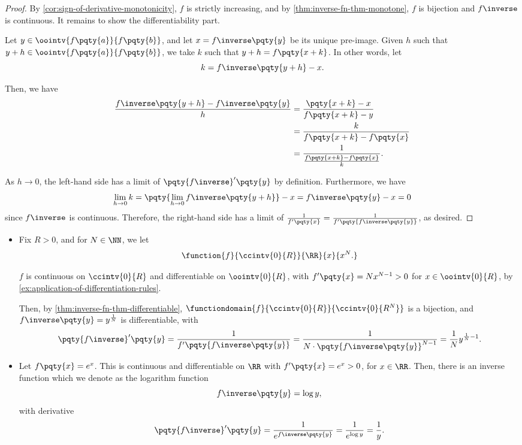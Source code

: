 \begin{proof}
    By \autoref{cor:sign-of-derivative-monotonicity}, \(f\) is strictly increasing, and by \autoref{thm:inverse-fn-thm-monotone}, \(f\) is bijection and \(f\inverse\) is continuous. It remains to show the differentiability part.

    Let \(y \in \oointv{f\pqty{a}}{f\pqty{b}}\), and let \(x = f\inverse\pqty{y}\) be its unique pre-image. Given \(h\) such that \(y + h \in \oointv{f\pqty{a}}{f\pqty{b}}\), we take \(k\) such that \(y + h = f\pqty{x + k}\). In other words, let
    \[
        k = f\inverse\pqty{y + h} - x.
    \]

    Then, we have
    \begin{align*}
        \frac{f\inverse\pqty{y + h} - f\inverse\pqty{y}}{h} &= \frac{\pqty{x + k} - x}{f\pqty{x + k} - y} \\
        &= \frac{k}{f\pqty{x + k} - f\pqty{x}} \\
        &= \frac{1}{\frac{f\pqty{x + k} - f\pqty{x}}{k}}.
    \end{align*}

    As \(h \to 0\), the left-hand side has a limit of \(\pqty{f\inverse}' \pqty{y}\) by definition. Furthermore, we have
    \[
        \lim_{h \to 0} k = \pqty{\lim_{h \to 0} f\inverse\pqty{y + h}} - x = f\inverse\pqty{y} - x = 0
    \]
    since \(f\inverse\) is continuous. Therefore, the right-hand side has a limit of \(\frac{1}{f'\pqty{x}} = \frac{1}{f'\pqty{f\inverse\pqty{y}}}\), as desired.
\end{proof}

\begin{examples}
    \label{ex:inverse-fn-differentiation}%
    \begin{itemize}
        \item Fix \(R > 0\), and for \(N \in \NN\), we let
        \[
            \function{f}{\ccintv{0}{R}}{\RR}{x}{x^N.}
        \]

        \(f\) is continuous on \(\ccintv{0}{R}\) and differentiable on \(\oointv{0}{R}\), with \(f'\pqty{x} = N x^{N - 1} > 0\) for \(x \in \oointv{0}{R}\), by \autoref{ex:application-of-differentiation-rules}.

        Then, by \autoref{thm:inverse-fn-thm-differentiable}, \(\functiondomain{f}{\ccintv{0}{R}}{\ccintv{0}{R^N}}\) is a bijection, and \(f\inverse\pqty{y} = y^{\frac{1}{N}}\) is differentiable, with
        \[
            \pqty{f\inverse}' \pqty{y} = \frac{1}{f'\pqty{f\inverse\pqty{y}}} = \frac{1}{N \cdot \pqty{f\inverse\pqty{y}}^{N - 1}} = \frac{1}{N} y^{\frac{1}{N} - 1}.
        \]

        \item Let \(f\pqty{x} = e^x\). This is continuous and differentiable on \(\RR\) with \(f'\pqty{x} = e^x > 0\), for \(x \in \RR\). Then, there is an inverse function which we denote as the logarithm function
        \[
            f\inverse\pqty{y} = \log y,
        \]
        with derivative
        \[
            \pqty{f\inverse}'\pqty{y} = \frac{1}{e^{f\inverse\pqty{y}}} = \frac{1}{e^{\log y}} = \frac{1}{y}.
        \]
    \end{itemize}
\end{examples}


